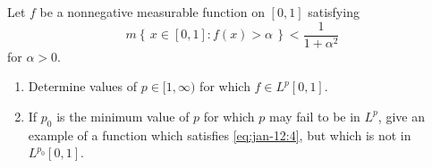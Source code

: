 \begin{problem}
  Let \(f\) be a nonnegative measurable function on \([0,1]\) satisfying
  \[
    \label{eq:jan-12:4}%
    \tag{\(\)}%
    m\left\{\,x\in[0,1]:f(x)>\alpha\,\right\}<\frac{1}{1+\alpha^2}
  \]
  for \(\alpha>0\).
  \begin{enumerate}[label=(\alph*),noitemsep]
  \item Determine values of \(p\in[1,\infty)\) for which \(f\in L^p[0,1]\).
  \item If \(p_0\) is the minimum value of \(p\) for which \(p\) may fail
    to be in \(L^p\), give an example of a function which satisfies
    \eqref{eq:jan-12:4}, but which is not in \(L^{p_0}[0,1]\).
\end{enumerate}
\end{problem}
\begin{solution}
\end{solution}

